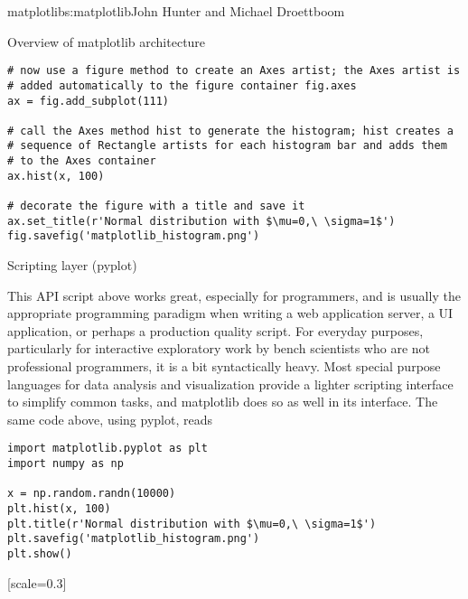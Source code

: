 \begin{aosachapter}{matplotlib}{s:matplotlib}{John Hunter and Michael Droettboom}
\begin{aosasect1}{Overview of matplotlib architecture}
\begin{verbatim}
# now use a figure method to create an Axes artist; the Axes artist is
# added automatically to the figure container fig.axes
ax = fig.add_subplot(111)

# call the Axes method hist to generate the histogram; hist creates a
# sequence of Rectangle artists for each histogram bar and adds them
# to the Axes container
ax.hist(x, 100)

# decorate the figure with a title and save it
ax.set_title(r'Normal distribution with $\mu=0,\ \sigma=1$')
fig.savefig('matplotlib_histogram.png')
\end{verbatim}

\begin{aosasect2}{Scripting layer (pyplot)}

This API script above works great, especially for programmers, and is
usually the appropriate programming paradigm when writing a web
application server, a UI application, or perhaps a production quality
script.  For everyday purposes, particularly for interactive
exploratory work by bench scientists who are not professional
programmers, it is a bit syntactically heavy.  Most special purpose
languages for data analysis and visualization provide a lighter
scripting interface to simplify common tasks, and matplotlib does so
as well in its  interface.  The same code
above, using pyplot, reads

\begin{verbatim}
import matplotlib.pyplot as plt
import numpy as np

x = np.random.randn(10000)
plt.hist(x, 100)
plt.title(r'Normal distribution with $\mu=0,\ \sigma=1$')
plt.savefig('matplotlib_histogram.png')
plt.show()
\end{verbatim}

[scale=0.3]



\end{aosasect2}
\end{aosasect1}
\end{aosachapter}
